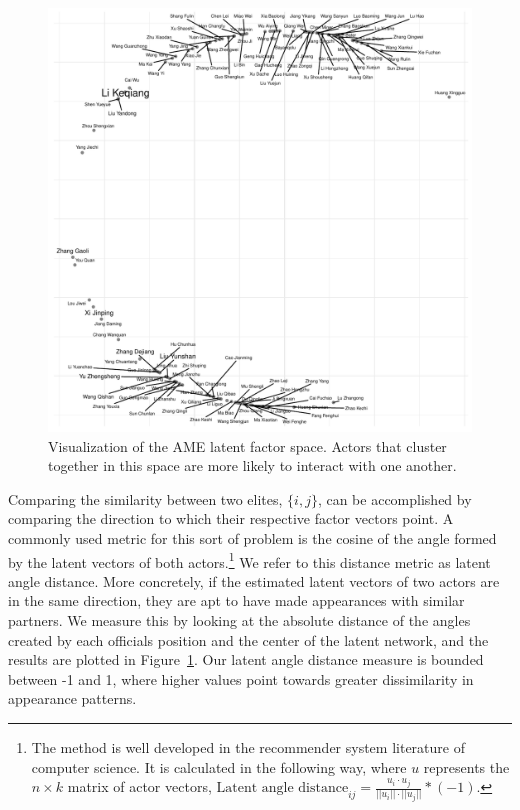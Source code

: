 \documentclass[11pt,english]{article}
\begin{document}
\begin{flushleft}
\noindent \begin{center}
\begin{figure}[H]
\noindent \begin{centering}
\includegraphics[width=5in]{uViz}
\par\end{centering}
\caption{Visualization of the AME latent factor space. Actors that cluster together in this space are more likely
to interact with one another.}
\label{fig:uv}
\end{figure}
\par\end{center}

Comparing the similarity between two elites, $\{i,j\}$, can be accomplished by comparing the direction to which their respective factor vectors point. A commonly used metric for this sort of problem is the cosine of the angle formed by the latent vectors of both actors.\footnote{The method is well developed in the recommender system literature of computer science. It is calculated in the following way, where $u$ represents the $n\times k$ matrix of actor vectors, $\text{Latent angle distance}_{ij}=\frac{u_{i}\cdot u_{j}}{||u_{i}||\cdot||u_{j}||}*(-1)$. } We refer to this distance metric as latent angle distance. More concretely, if the estimated latent vectors of two actors are in the same direction, they are apt to have made appearances with similar partners. We measure this by looking at the absolute distance of the angles created by each officials position and the center of the latent network, and the results are plotted in Figure~\ref{fig:uv}. Our latent angle distance measure is bounded between -1 and 1, where higher values point towards greater dissimilarity in appearance patterns. 


\end{flushleft}
\end{document}
